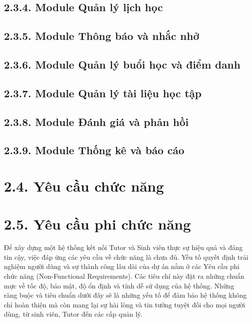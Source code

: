 \subsection*{2.3.4. Module Quản lý lịch học}

\subsection*{2.3.5. Module Thông báo và nhắc nhở}

\subsection*{2.3.6. Module Quản lý buổi học và điểm danh}

\subsection*{2.3.7. Module Quản lý tài liệu học tập}

\subsection*{2.3.8. Module Đánh giá và phản hồi}

\subsection*{2.3.9. Module Thống kê và báo cáo}


\section*{2.4. Yêu cầu chức năng}



\section*{2.5. Yêu cầu phi chức năng}
Để xây dựng một hệ thống kết nối Tutor và Sinh viên thực sự hiệu quả và đáng tin cậy, việc đáp ứng các yêu cầu về chức năng là chưa đủ. Yếu tố quyết định trải nghiệm người dùng và sự thành công lâu dài của dự án nằm ở các Yêu cầu phi chức năng (Non-Functional Requirements). Các tiêu chí này đặt ra những chuẩn mực về tốc độ, bảo mật, độ ổn định và tính dễ sử dụng của hệ thống. Những ràng buộc và tiêu chuẩn dưới đây sẽ là những yếu tố để đảm bảo hệ thống không chỉ hoàn thiện mà còn mang lại sự hài lòng và tin tưởng tuyệt đối cho mọi người dùng, từ sinh viên, Tutor đến các cấp quản lý.

